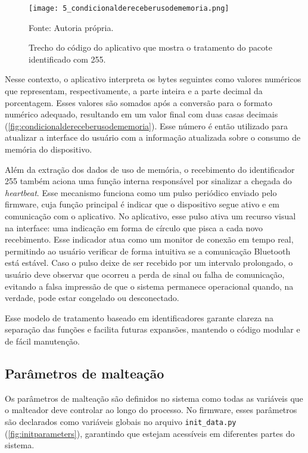 \begin{figure}[ht]
    \centering
    \caption{Trecho do código do aplicativo que mostra o tratamento do pacote identificado com 255.}
    \label{fig:condicionaldereceberusodememoria}
    \texttt{[image: 5\_condicionaldereceberusodememoria.png]}

    {\centering\footnotesize Fonte: Autoria própria.\par}
\end{figure}


Nesse contexto, o aplicativo interpreta os bytes seguintes como valores numéricos que representam, respectivamente, a parte inteira e a parte decimal da porcentagem. Esses valores são somados após a conversão para o formato numérico adequado, resultando em um valor final com duas casas decimais (\autoref{fig:condicionaldereceberusodememoria}). Esse número é então utilizado para atualizar a interface do usuário com a informação atualizada sobre o consumo de memória do dispositivo.

Além da extração dos dados de uso de memória, o recebimento do identificador 255 também aciona uma função interna responsável por sinalizar a chegada do \textit{heartbeat}. Esse mecanismo funciona como um pulso periódico enviado pelo firmware, cuja função principal é indicar que o dispositivo segue ativo e em comunicação com o aplicativo. No aplicativo, esse pulso ativa um recurso visual na interface: uma indicação em forma de círculo que pisca a cada novo recebimento. Esse indicador atua como um monitor de conexão em tempo real, permitindo ao usuário verificar de forma intuitiva se a comunicação Bluetooth está estável. Caso o pulso deixe de ser recebido por um intervalo prolongado, o usuário deve observar que ocorreu a perda de sinal ou falha de comunicação, evitando a falsa impressão de que o sistema permanece operacional quando, na verdade, pode estar congelado ou desconectado.

Esse modelo de tratamento baseado em identificadores garante clareza na separação das funções e facilita futuras expansões, mantendo o código modular e de fácil manutenção.


\subsection{Parâmetros de malteação}

Os parâmetros de malteação são definidos no sistema como todas as variáveis que o malteador deve controlar ao longo do processo. No firmware, esses parâmetros são declarados como variáveis globais no arquivo \texttt{init\_data.py} (\autoref{fig:initparameters}), garantindo que estejam acessíveis em diferentes partes do sistema.

